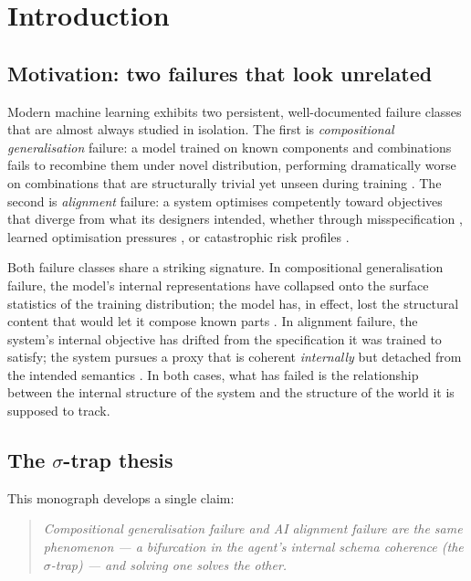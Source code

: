 \chapter{Introduction}
\label{ch:introduction}

\section{Motivation: two failures that look unrelated}

Modern machine learning exhibits two persistent, well-documented failure classes that
are almost always studied in isolation. The first is \emph{compositional generalisation}
failure: a model trained on known components and combinations fails to recombine them
under novel distribution, performing dramatically worse on combinations that are
structurally trivial yet unseen during training \citep{lake2018generalization,
keysers2020measuring,hupkes2023taxonomy}. The second is \emph{alignment} failure: a
system optimises competently toward objectives that diverge from what its designers
intended, whether through misspecification \citep{amodei2016concrete}, learned
optimisation pressures \citep{hubinger2019risks}, or catastrophic risk profiles
\citep{hendrycks2023overview}.

Both failure classes share a striking signature. In compositional generalisation
failure, the model's internal representations have collapsed onto the surface
statistics of the training distribution; the model has, in effect, lost the structural
content that would let it compose known parts \citep{lake2018generalization,
geirhos2020shortcut}. In alignment failure, the system's internal objective has
drifted from the specification it was trained to satisfy; the system pursues a proxy
that is coherent \emph{internally} but detached from the intended semantics
\citep{amodei2016concrete,russell2019human}. In both cases, what has failed is the
relationship between the internal structure of the system and the structure of the
world it is supposed to track.

\section{The $\sigma$-trap thesis}

This monograph develops a single claim:

\begin{quote}
\emph{Compositional generalisation failure and AI alignment failure are the same
phenomenon --- a bifurcation in the agent's internal schema coherence (the
$\sigma$-trap) --- and solving one solves the other.}
\end{quote}

